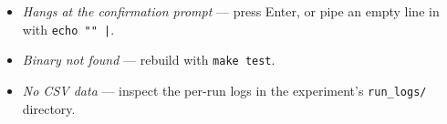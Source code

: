 \begin{itemize}
  \item \emph{Hangs at the confirmation prompt} --- press Enter, or pipe an
    empty line in with \texttt{echo "" |}.
  \item \emph{Binary not found} --- rebuild with \texttt{make test}.
  \item \emph{No CSV data} --- inspect the per-run logs in the experiment's
    \texttt{run\_logs/} directory.
\end{itemize}

